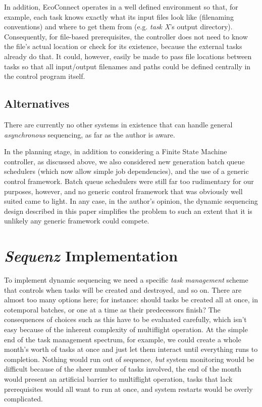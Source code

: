 \documentclass[11pt,a4paper]{article}
\begin{document}
In addition, EcoConnect operates in a well defined environment so that,
for example, each task knows exactly what its input files look like
(filenaming conventions) and where to get them from (e.g. {\em task X}'s
output directory). Consequently, for file-based prerequisites, the
controller does not need to know the file's actual location or check for
its existence, because the external tasks already do that. It could,
however, easily be made to pass file locations between tasks so that all
input/output filenames and paths could be defined centrally in the
control program itself.  


\subsection{Alternatives}

There are currently no other systems in existence that can handle
general {\em asynchronous} sequencing, as far as the author is aware.

In the planning stage, in addition to considering a Finite State Machine
controller, as discussed above, we also considered new generation batch
queue schedulers (which now allow simple job dependencies), and the use
of a generic control framework.  Batch queue schedulers were still far
too rudimentary for our purposes, however, and no generic control
framework that was obviously well suited came to light. In any case, in
the author's opinion, the dynamic sequencing design described in this
paper simplifies the problem to such an extent that it is unlikely any
generic framework could compete.  


\section{{\em Sequenz} Implementation}

To implement dynamic sequencing we need a specific {\em task management}
scheme that controls when tasks will be created and destroyed, and so
on. There are almost too many options here; for instance: should tasks
be created all at once, in cotemporal batches, or one at a time as their
predecessors finish? The consequences of choices such as this have to
be evaluated carefully, which isn't easy because of the inherent
complexity of multiflight operation. At the simple end of the task
management spectrum, for example, we could create a whole month's worth
of tasks at once and just let them interact until everything runs to
completion. Nothing would run out of sequence, {\em but} system
monitoring would be difficult because of the sheer number of tasks
involved, the end of the month would present an artificial barrier to
multiflight operation, tasks that lack prerequisites would all want to
run at once, and system restarts would be overly complicated. 
\end{document}
